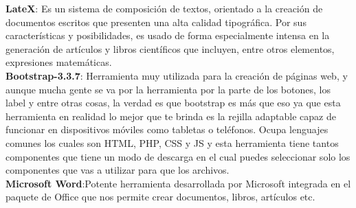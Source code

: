 \textbf{LateX}: Es un sistema de composición de textos, orientado a la creación de documentos escritos que presenten una alta calidad tipográfica. Por sus características y posibilidades, es usado de forma especialmente intensa en la generación de artículos y libros científicos que incluyen, entre otros elementos, expresiones matemáticas.\\

\textbf{Bootstrap-3.3.7}: Herramienta muy utilizada para la creación de páginas web, y aunque mucha gente se va por la herramienta por la parte de los botones, los label y entre otras cosas, la verdad es que bootstrap es más que eso ya que esta herramienta en realidad lo mejor que te brinda es la rejilla adaptable capaz de funcionar en dispositivos móviles como tabletas o teléfonos. Ocupa lenguajes comunes los cuales son HTML, PHP, CSS y JS y esta herramienta tiene tantos componentes que tiene un modo de descarga en el cual puedes seleccionar solo los componentes que vas a utilizar para que los archivos. \\

\textbf{Microsoft Word}:Potente herramienta desarrollada por Microsoft integrada en el paquete de Office que nos permite crear documentos, libros, artículos etc.\\
